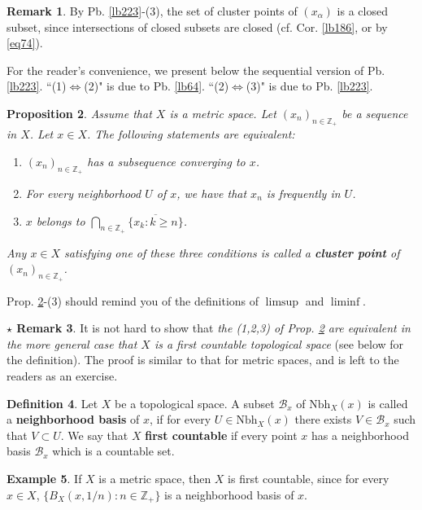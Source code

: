 \documentclass[12pt,b5paper,notitlepage]{article}
\theoremstyle{definition}
\newtheorem{df}{Definition}[section]
\newtheorem{eg}[df]{Example}
\newtheorem{rem}[df]{Remark}
\newtheorem{srem}[df]{$\star$ Remark}
\theoremstyle{plain}
\newtheorem{pp}[df]{Proposition}
\newcommand{\mc}{\mathcal}
\newcommand{\ovl}{\overline}
\newcommand{\Zbb}{\mathbb Z}
\newcommand{\dps}{\displaystyle}
\newcommand{\Nbh}{\mathrm{Nbh}}
\numberwithin{equation}{section}
\begin{document}
\begin{rem}\label{lb238}
By Pb. \ref{lb223}-(3), the set of cluster points of $(x_\alpha)$ is a closed subset, since intersections of closed subsets are closed (cf. Cor. \ref{lb186}, or by \eqref{eq74}).
\end{rem}

For the reader's convenience, we present below the sequential version of Pb. \ref{lb223}. ``(1)$\Leftrightarrow$(2)" is due to Pb. \ref{lb64}. ``(2)$\Leftrightarrow$(3)" is due to Pb. \ref{lb223}.

\begin{pp}\label{lb256}
Assume that $X$ is a metric space. Let $(x_n)_{n\in\Zbb_+}$ be a sequence in $X$. Let $x\in X$. The following statements are equivalent:
\begin{enumerate}[label=(\arabic*)]
\item $(x_n)_{n\in\Zbb_+}$ has a subsequence converging to $x$.
\item For every neighborhood $U$ of $x$, we have that $x_n$ is frequently in $U$.
\item $x$ belongs to $\dps\bigcap_{n\in\Zbb_+}\ovl{\{x_k:k\geq n\}}$.
\end{enumerate}
Any $x\in X$ satisfying one of these three conditions is called a \textbf{cluster point} of  $(x_n)_{n\in\Zbb_+}$.
\end{pp} 

Prop. \ref{lb256}-(3) should remind you of the definitions of $\limsup$ and $\liminf$.



\begin{srem}\label{lb263}
It is not hard to show that \textit{the (1,2,3) of Prop. \ref{lb256} are equivalent in the more general case that $X$ is a first countable topological space} (see below for the definition). The proof is similar to that for metric spaces, and is left to the readers as an exercise.
\end{srem}

\begin{df}\label{lb262}
Let $X$ be a topological space. A subset $\mc B_x$ of $\Nbh_X(x)$ is called a \textbf{neighborhood basis}  of $x$, if for every $U\in\Nbh_X(x)$ there exists $V\in\mc B_x$ such that $V\subset U$. We say that $X$ \textbf{first countable}  if every point $x$ has a neighborhood basis $\mc B_x$ which is a countable set.  
\end{df}


\begin{eg}
If $X$ is a metric space, then $X$ is first countable, since for every $x\in X$, $\{B_X(x,1/n):n\in\Zbb_+\}$ is a neighborhood basis of $x$.
\end{eg}
\end{document}

